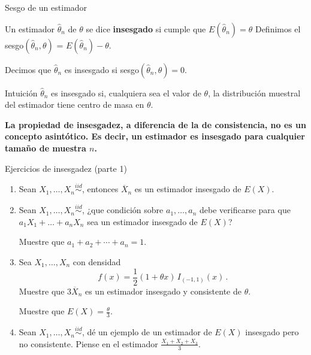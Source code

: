 \documentclass{beamer}
\theoremstyle{definition}
\begin{document}
\begin{frame}{\color{rosee}Sesgo de un estimador}
  \begin{definition}
    Un estimador $\widehat{\theta}_n$ de $\theta$ se dice \textbf{insesgado} si cumple que $E(\widehat{\theta}_n)=\theta$
     Definimos el sesgo$(\widehat{\theta}_n,\theta)$ = $E(\widehat{\theta}_n)-\theta$.
  \end{definition}
  
  Decimos que $\widehat{\theta}_n$ es insesgado si sesgo$(\widehat{\theta}_n,\theta)=0$.
  \begin{alertblock}{\color{rosee}Intuición}
    $\widehat{\theta}_n$ es insesgado si, cualquiera sea el valor de $\theta$,
    la distribuci\'on muestral del estimador tiene centro de masa en
    $\theta$. 
  \end{alertblock}
  
  \textbf{La propiedad de insesgadez, a diferencia de la de
      consistencia, no es un concepto asint\'otico. Es decir, un estimador es insesgado para cualquier tamaño de muestra $n$.}
\end{frame}

\begin{frame}{\color{rosee}Ejercicios de insesgadez (parte 1)}\small
  \begin{enumerate}
      \item Sean $X_{1},\dots,X_{n} \stackrel{iid}{\sim}$,  entonces $\overline{X}_n$ es un estimador insesgado de $E(X)$.
\item Sean $X_{1},\dots,X_{n} \stackrel{iid}{\sim}$, ¿que condición sobre $a_1,\dots,a_n$ debe verificarse para que $a_1X_1+\dots+a_nX_n$ sea un estimador insesgado de $E(X)$?

\vspace{6pt}

\color{gray} Muestre que $a_1+a_2+\cdots + a_n=1$.\color{black}

\vspace{6pt}

\item  Sea $X_{1},\dots, X_{n}$ con densidad
    \[f(x)=\frac{1}{2} (1+\theta x) \, I_{(-1,1)}(x)\,.\]
    Muestre que $3 \overline{X}_{n}$ es un estimador insesgado y
    consistente de $\theta$.
    \vspace{6pt}
    
    \color{gray} Muestre que $E(X)=\frac{\theta}{3}$.\color{black}
    \item Sean $X_{1},\dots,X_{n} \stackrel{iid}{\sim}$, d\'e un ejemplo de un estimador de $E(X)$ insesgado pero no consistente.
       \color{gray} Piense en el estimador $\frac{X_1+X_2+X_3}{3}$.\color{black}
\end{enumerate}
\end{frame}
\end{document}

